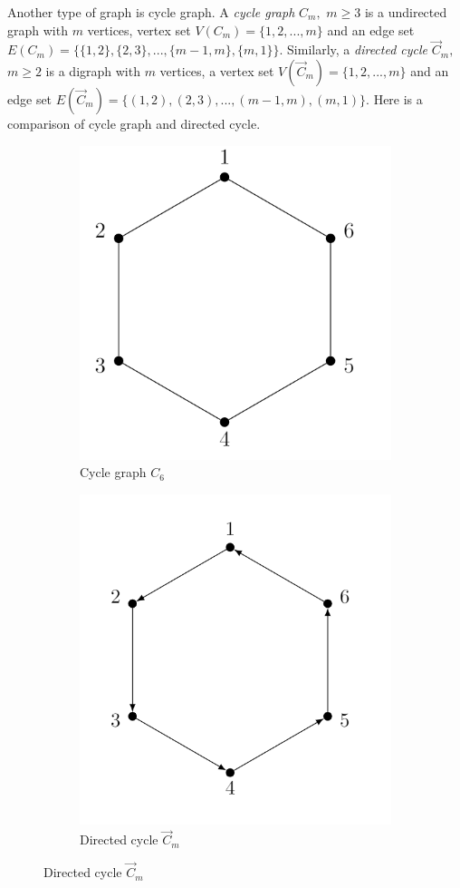 \documentclass[twoside,11pt]{article}
\numberwithin{equation}{section} \DeclareMathOperator{\Var}{Var}
\newcommand{\ora}[1]{\overrightarrow{#1}}
\begin{document}
Another type of graph is cycle graph. A {\it cycle graph } ${C_m},$ $m\geq 3$ is a undirected graph with $m$ vertices, vertex set  $V({C_m})=\{1,2,...,m\}$ and an edge set $E({C_m})=\{\{1,2\},\{2,3\},...,\{m-1,m\}, \{m,1\}\}$. Similarly, a {\it directed cycle } $\ora{C}_m,$ $m\geq 2$ is a digraph with $m$ vertices, a vertex set
$V(\ora{C}_m)=\{1,2,...,m\}$ and an edge set $E(\ora{C}_m)=\{(1,2),(2,3),...,(m-1,m),(m,1)\}.$ Here is a comparison of cycle graph and directed cycle.

\begin{figure}[H]
\begin{subfigure}{.5\textwidth}
  \centering
  \includegraphics[width=.8\linewidth]{tik_undirected_c6.PNG}  
  \caption{Cycle graph $C_6$}
  \label{fig:sub-first}
\end{subfigure}
\begin{subfigure}{.5\textwidth}
  \centering
  \includegraphics[width=.8\linewidth]{tik_c6.PNG}  
  \caption{Directed cycle $\ora{C}_m$}
  \label{fig:sub-second}
\end{subfigure}
\end{figure}
\end{document}
